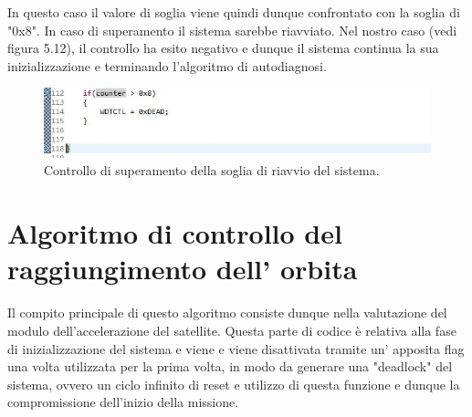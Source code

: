 \documentclass[LaM,binding=0.6cm]{../sapthesis}
\begin{document}
In questo caso il valore di soglia viene quindi dunque confrontato con la soglia di "0x8". In caso di superamento il sistema sarebbe riavviato. Nel nostro caso (vedi figura 5.12), il controllo ha esito negativo e dunque il sistema continua la sua inizializzazione e terminando l'algoritmo di autodiagnosi.\newline

\begin{figure}[htbp]
\centerline{\includegraphics[scale=0.7]{examples/9_ControlloDelNumeroDiFaultNO_RIAVVIO.JPG}}
\caption{Controllo di superamento della soglia di riavvio del sistema.}
\label{fig}
\end{figure}


\newpage





\chapter{Algoritmo di controllo del raggiungimento dell' orbita}
Il compito principale di questo algoritmo consiste dunque nella valutazione del modulo dell’accelerazione del satellite. Questa parte di codice è relativa alla fase di inizializzazione del sistema e viene e viene disattivata tramite un' apposita flag una volta utilizzata per la prima volta, in modo da generare una "deadlock" del sistema, ovvero un ciclo infinito di reset e utilizzo di questa funzione e dunque la compromissione dell'inizio  della missione.
\end{document}
